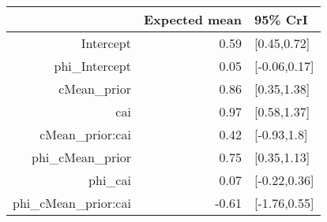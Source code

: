 \begin{tabular}{rrl}
  \hline
 & Expected mean & 95\% CrI \\ 
  \hline
Intercept & 0.59 & [0.45,0.72] \\ 
  phi\_Intercept & 0.05 & [-0.06,0.17] \\ 
  cMean\_prior & 0.86 & [0.35,1.38] \\ 
  cai & 0.97 & [0.58,1.37] \\ 
  cMean\_prior:cai & 0.42 & [-0.93,1.8] \\ 
  phi\_cMean\_prior & 0.75 & [0.35,1.13] \\ 
  phi\_cai & 0.07 & [-0.22,0.36] \\ 
  phi\_cMean\_prior:cai & -0.61 & [-1.76,0.55] \\ 
   \hline
\end{tabular}

